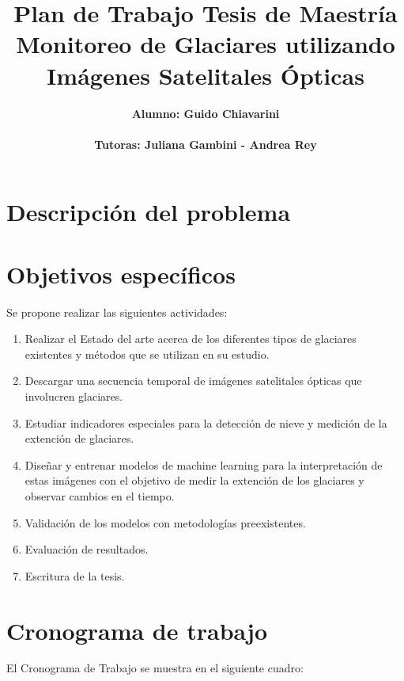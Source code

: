 \documentclass[10pt]{article}
\begin{document}
\title{{\bf Plan de Trabajo Tesis de Maestría}\\ Monitoreo de Glaciares utilizando Imágenes Satelitales Ópticas
}
\author{ 
	 \bf{Alumno}: Guido Chiavarini\\
 \ \\
\bf{Tutoras:  Juliana Gambini - Andrea Rey}}
\date{}
\maketitle
	\Large{\textbf{}}
	
	\section{Descripción del problema}



\section{Objetivos específicos}
Se propone realizar las siguientes actividades: 
\begin{enumerate}
	
	\item Realizar el Estado del arte acerca de los diferentes tipos de glaciares existentes y métodos que se utilizan en su estudio.
	\item Descargar una secuencia temporal de imágenes satelitales ópticas que involucren glaciares.
	\item Estudiar indicadores especiales para la detección de nieve y medición de la extención de glaciares. 
	\item Diseñar y entrenar modelos de machine learning para la interpretación de estas imágenes con el objetivo de medir la extención de los glaciares y observar cambios en el tiempo.
	\item Validación de los modelos con metodologías preexistentes.
	\item Evaluación de resultados.
	\item Escritura de la tesis.
	
	
	
	
\end{enumerate}


\section{Cronograma de trabajo}

El Cronograma de Trabajo se muestra en el siguiente cuadro:
\end{document}
